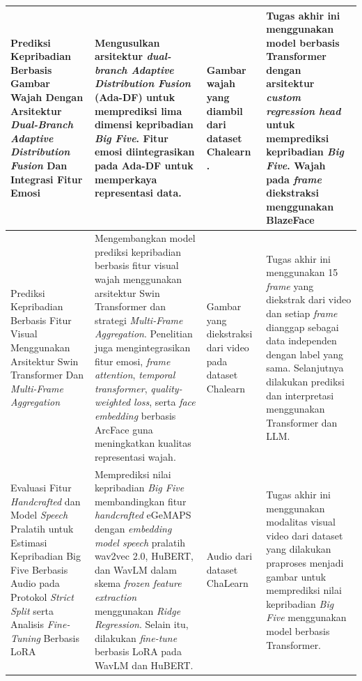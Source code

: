 {\begin{xltabular}{\textwidth}{|
			>{\hsize}X |
			>{\hsize}X |
			>{\hsize}X |
			>{\hsize}X | }
		Prediksi Kepribadian Berbasis Gambar Wajah Dengan Arsitektur \textit{Dual-Branch Adaptive Distribution Fusion} Dan Integrasi Fitur Emosi \parencite{Aryan2025} & Mengusulkan arsitektur \textit{dual-branch Adaptive Distribution Fusion} (Ada-DF) untuk memprediksi lima dimensi kepribadian \textit{Big Five}. Fitur emosi diintegrasikan pada Ada-DF untuk memperkaya representasi data. & Gambar wajah yang diambil dari dataset Chalearn \parencite{Ponce-Lpez2016}. & Tugas akhir ini menggunakan model berbasis Transformer dengan arsitektur \textit{custom regression head} untuk memprediksi kepribadian \textit{Big Five}. Wajah pada \textit{frame} diekstraksi menggunakan BlazeFace \\ \hline
		
		Prediksi Kepribadian Berbasis Fitur Visual Menggunakan Arsitektur Swin Transformer Dan \textit{Multi-Frame Aggregation} \parencite{Wildan2026} & Mengembangkan model prediksi kepribadian berbasis fitur visual wajah menggunakan arsitektur Swin Transformer dan strategi \textit{Multi-Frame Aggregation}. Penelitian juga mengintegrasikan fitur emosi, \textit{frame attention}, \textit{temporal transformer}, \textit{quality-weighted loss}, serta \textit{face embedding} berbasis ArcFace guna meningkatkan kualitas representasi wajah. & Gambar yang diekstraksi dari video pada dataset Chalearn \parencite{Ponce-Lpez2016} & Tugas akhir ini menggunakan 15 \textit{frame} yang diekstrak dari video dan setiap \textit{frame} dianggap sebagai data independen dengan label yang sama. Selanjutnya dilakukan prediksi dan interpretasi menggunakan Transformer dan LLM. \\ \hline
		
		Evaluasi Fitur \textit{Handcrafted} dan Model \textit{Speech} Pralatih untuk Estimasi Kepribadian Big Five Berbasis Audio pada Protokol \textit{Strict Split} serta Analisis \textit{Fine-Tuning} Berbasis LoRA \parencite{Aqil2026} & Memprediksi nilai kepribadian \textit{Big Five} membandingkan fitur \textit{handcrafted} eGeMAPS dengan \textit{embedding model speech} pralatih wav2vec 2.0, HuBERT, dan WavLM dalam skema \textit{frozen feature extraction} menggunakan \textit{Ridge Regression}. Selain itu, dilakukan \textit{fine-tune} berbasis LoRA pada WavLM dan HuBERT. & Audio dari dataset ChaLearn \parencite{Ponce-Lpez2016} & Tugas akhir ini menggunakan modalitas visual video dari dataset yang dilakukan praproses menjadi gambar untuk memprediksi nilai kepribadian \textit{Big Five} menggunakan model berbasis Transformer. \\ \hline
		

\end{xltabular}}
